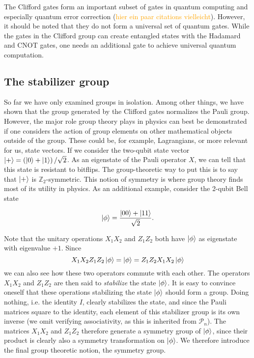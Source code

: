 The Clifford gates form an important subset of gates in quantum computing and
especially quantum error correction (\textcolor{orange}{hier ein paar citations
vielleicht}). However, it should be noted that they do not form a universal set
of quantum gates. While the gates in the Clifford group can create entangled
states with the Hadamard and CNOT gates, one needs an additional gate to
achieve universal quantum computation.
\subsection{The stabilizer group}

So far we have only examined groups in isolation. Among other things, we have
shown that the group generated by the Clifford gates normalizes the Pauli
group.  However, the major role group theory plays in physics can best be
demonstrated if one considers the action of group elements on other
mathematical objects outside of the group. These could be, for example,
Lagrangians, or more relevant for us, state vectors. If we consider the
two-qubit state vector $\ket{+} = \left( \ket{0} + \ket{1} \right) / \sqrt{2}$.
As an eigenstate of the Pauli operator $X$, we can tell that this state is
resistant to bitflips.  The group-theoretic way to put this is to say that
$\ket{+}$ is $\mathbb{Z}_2$-symmetric. This notion of symmetry is where group
theory finds most of its utility in physics.  As an additional example,
consider the 2-qubit Bell state

\begin{align}
  \ket{\phi} = \frac{\ket{00} + \ket{11}}{\sqrt{2}} 
.\end{align}

Note that the unitary operations $X_1 X_2$ and $Z_1 Z_2$ both have $\ket{\phi}$
as eigenstate with eigenvalue $+1$. Since $$X_1X_2Z_1Z_2\ket{\phi} = \ket{\phi} =
Z_1Z_2X_1X_2\ket{\phi}$$ we can also see how these two operators commute with each
other. The operators $X_1X_2$ and $Z_1Z_2$ are then said to \emph{stabilize} the
state $\ket{\phi}$. It is easy to convince oneself that these operations
stabilizing the state $\ket{\phi}$ should form a group. Doing nothing, i.e. the
identity $I$, clearly stabilizes the state, and since the Pauli matrices square
to the identity, each element of this stabilizer group is its own inverse (we
omit verifying associativity, as this is inherited from $\mathcal{P}_n$). The
matrices $X_1X_2$ and $Z_1Z_2$ therefore generate a symmetry group of
$\ket{\phi}$, since their product is clearly also a symmetry transformation on
$\ket{\phi}$. We therefore introduce the final group theoretic notion, the
symmetry group.


